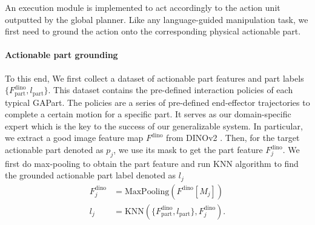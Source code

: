 


An execution module is implemented to act accordingly to the action unit outputted by the global planner.
Like any language-guided manipulation task, we first need to ground the action onto the corresponding physical actionable part.

\paragraph{Actionable part grounding} 
To this end, We first collect a dataset of actionable part features and part labels $\{{F}^\text{dino}_\text{part}, l_\text{part}\}$. 
This dataset contains the pre-defined interaction policies of each typical GAPart. The policies are a series of pre-defined end-effector trajectories to complete a certain motion for a specific part. It serves as our domain-specific expert which is the key to the success of our generalizable system.
In particular,
we extract a good image feature map $F^\text{dino}$ from DINOv2 \citep{oquab2023dinov2}. Then, for the target actionable part denoted as $p_j$, we use its mask to get the part feature $F^\text{dino}_j$.
We first do max-pooling to obtain the part feature and run KNN algorithm to find the grounded actionable part label denoted as $l_j$
%
\begin{align*}
    F^\text{dino}_j &= \text{MaxPooling}(F^\text{dino} [M_j]) \\
    l_j &= \text{KNN}(\{{F}^\text{dino}_\text{part}, l_\text{part}\}, F_j^\text{dino}).
\end{align*}

